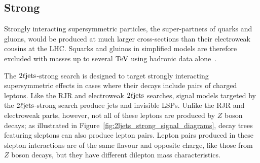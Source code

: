\FloatBarrier
\subsection{Strong}
\label{sec:2ljets_origins_strong}
Strongly interacting supersymmetric particles, the super-partners of quarks and
gluons, would be produced at much larger cross-sections than their electroweak
cousins at the LHC.
Squarks and gluinos in simplified models are therefore excluded with masses up
to several $\eV[T]$ using hadronic data alone~\cite{atlas_susy_strong_0l}.

The $\twoljets$-strong search is designed to target strongly interacting
supersymmetric effects in cases where their decays include pairs of charged
leptons.
Like the RJR and electroweak $\twoljets$ searches, signal models targeted by
the $\twoljets$-strong search produce jets and invisible LSPs.
Unlike the RJR and electroweak parts, however, not all of these leptons are
produced by $Z$ boson decays;
as illustrated in Figure~\ref{fig:2ljets_strong_signal_diagrams}, decay trees
featuring sleptons can also produce lepton pairs.
Lepton pairs produced in these slepton interactions are of the same flavour
and opposite charge, like those from $Z$ boson decays, but they have different
dilepton mass characteristics.

